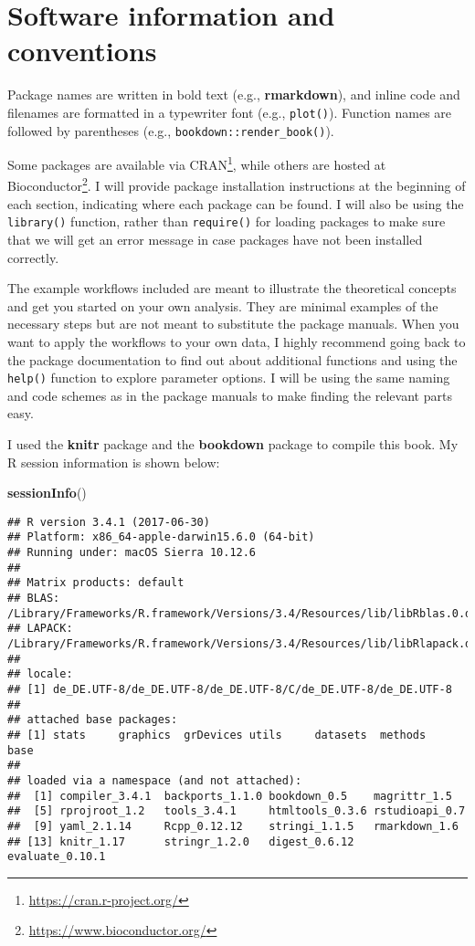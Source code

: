 \documentclass[12pt,]{krantz}
\newenvironment{Shaded}{\begin{snugshade}}{\end{snugshade}}
\newcommand{\KeywordTok}[1]{\textcolor[rgb]{0.27,0.27,0.27}{\textbf{#1}}}
\newcommand{\NormalTok}[1]{#1}
\renewcommand{\href}[2]{#2\footnote{\url{#1}}}
\theoremstyle{definition}
\theoremstyle{definition}
\theoremstyle{definition}
\theoremstyle{remark}
\begin{document}
\section*{Software information and
conventions}\label{software-information-and-conventions}


Package names are written in bold text (e.g., \textbf{rmarkdown}), and
inline code and filenames are formatted in a typewriter font (e.g.,
\texttt{plot()}). Function names are followed by parentheses (e.g.,
\texttt{bookdown::render\_book()}).

Some packages are available via
\href{https://cran.r-project.org/}{CRAN}, while others are
hosted at
\href{https://www.bioconductor.org/}{Bioconductor}.
I will provide package installation instructions at the beginning of
each section, indicating where each package can be found. I will also be
using the \texttt{library()} function, rather than \texttt{require()}
for loading packages to make sure that we will get an error message in
case packages have not been installed correctly.

The example workflows included are meant to illustrate the theoretical
concepts and get you started on your own analysis. They are minimal
examples of the necessary steps but are not meant to substitute the
package manuals. When you want to apply the workflows to your own data,
I highly recommend going back to the package documentation to find out
about additional functions and using the \texttt{help()} function to
explore parameter options. I will be using the same naming and code
schemes as in the package manuals to make finding the relevant parts
easy.

I used the \textbf{knitr} package and the
\textbf{bookdown} package to compile this book. My R
session information is shown below:

\begin{Shaded}
\begin{Highlighting}[]
\KeywordTok{sessionInfo}\NormalTok{()}
\end{Highlighting}
\end{Shaded}

\begin{verbatim}
## R version 3.4.1 (2017-06-30)
## Platform: x86_64-apple-darwin15.6.0 (64-bit)
## Running under: macOS Sierra 10.12.6
## 
## Matrix products: default
## BLAS: /Library/Frameworks/R.framework/Versions/3.4/Resources/lib/libRblas.0.dylib
## LAPACK: /Library/Frameworks/R.framework/Versions/3.4/Resources/lib/libRlapack.dylib
## 
## locale:
## [1] de_DE.UTF-8/de_DE.UTF-8/de_DE.UTF-8/C/de_DE.UTF-8/de_DE.UTF-8
## 
## attached base packages:
## [1] stats     graphics  grDevices utils     datasets  methods   base     
## 
## loaded via a namespace (and not attached):
##  [1] compiler_3.4.1  backports_1.1.0 bookdown_0.5    magrittr_1.5   
##  [5] rprojroot_1.2   tools_3.4.1     htmltools_0.3.6 rstudioapi_0.7 
##  [9] yaml_2.1.14     Rcpp_0.12.12    stringi_1.1.5   rmarkdown_1.6  
## [13] knitr_1.17      stringr_1.2.0   digest_0.6.12   evaluate_0.10.1
\end{verbatim}
\end{document}
